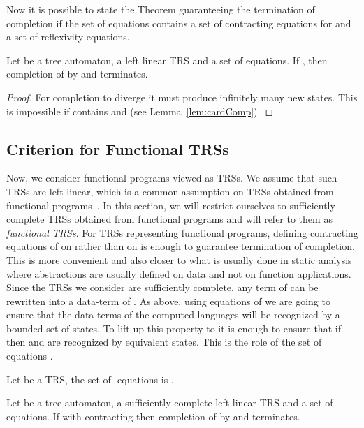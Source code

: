 \documentclass[a4paper,11pt]{llncs}
\theoremstyle{plain}
\begin{document}
\noindent
Now it is possible to state the Theorem guaranteeing the termination of
completion if the set of equations  contains a set of contracting equations
 for  and a set of reflexivity equations. 

\begin{theorem}
\label{th:termFinite}
Let  be a tree automaton,  a left linear TRS and  a set of
equations. If , then completion of  by  and
 terminates.\end{theorem}

\begin{proof}
For completion to diverge it must produce infinitely many new states. This is
impossible if  contains  and  (see
Lemma~\ref{lem:cardComp}). 
\end{proof}

\subsection{Criterion for Functional TRSs}
\label{sec:functional}
Now, we consider functional programs viewed as TRSs. We assume that such
TRSs are left-linear, which is a common assumption on TRSs obtained from
functional programs~\cite{BaaderN-book98}. In this section, we will restrict
ourselves to sufficiently complete TRSs obtained from functional programs and
will refer to them as {\em functional TRSs}. For TRSs representing functional programs,  
defining contracting equations of  on  rather than
on  is enough to guarantee termination of completion. This is more convenient and
also closer to what is usually done in static analysis where abstractions are
usually defined on data and not on function applications.
Since the TRSs we consider are sufficiently complete, any term of  can be
rewritten into a data-term of . As above, using equations of  we are going to
ensure that the data-terms of the computed languages will be
recognized by a bounded set of states. To lift-up this property to  it is
enough to ensure that  if  then 
and  are recognized by equivalent states. This is the role of the set of
equations .

\begin{definition}[]
Let  be a TRS, the set of -equations is .
\end{definition}





\begin{theorem}
\label{th:termComplete}
Let  be a tree automaton,  a sufficiently complete left-linear TRS and  a set of equations.
If  with  contracting then completion of  by  and 
terminates.\end{theorem}
\end{document}
